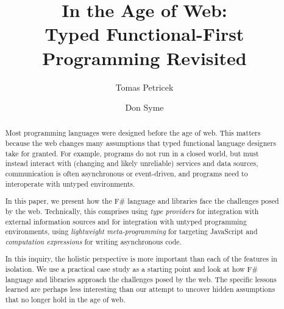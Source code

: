\documentclass[submission,copyright,creativecommons]{eptcs}
\title{In the Age of Web:\\
  \textnormal{\LARGE Typed Functional-First Programming Revisited}}
\author{Tomas Petricek
\institute{University of Cambridge, UK}
\email{tomas@tomasp.net}
\and
Don Syme
\institute{Microsoft Research Cambridge, UK}
\email{don.syme@microsoft.com}
}
\begin{document}
\maketitle


\begin{abstract}
Most programming languages were designed before the age of web.
This matters because the web changes many assumptions that typed functional language designers take
for granted. For example, programs do not run in a closed world, but must instead interact with
(changing and likely unreliable) services and data sources, communication is often asynchronous
or event-driven, and programs need to interoperate with untyped environments.

In this paper, we present how the F\# language and libraries face the challenges posed by the web.
Technically, this comprises using \emph{type providers} for integration with external information
sources and for integration with untyped programming environments, using \emph{lightweight
meta-programming} for targeting JavaScript and \emph{computation expressions} for writing
asynchronous code.

In this inquiry, the holistic perspective is more important than each of the features in isolation.
We use a practical case study as a starting point and look at how F\# language and libraries
approach the challenges posed by the web. The specific lessons learned are perhaps less interesting
than our attempt to uncover hidden assumptions that no longer hold in the age of web.
\end{abstract}



%
%
\end{document}
